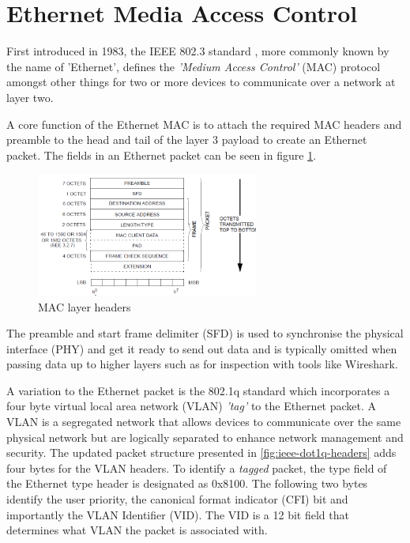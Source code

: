 \section{Ethernet Media Access Control}
\label{sec:eth_mac_lit}

First introduced in 1983, the IEEE 802.3 standard \cite{IEEE802.3-2012}, more commonly known by the name of 'Ethernet', defines the \textit{'Medium Access Control'} (MAC) protocol amongst other things for two or more devices to communicate over a network at layer two. 

A core function of the Ethernet MAC is to attach the required MAC headers and preamble to the head and tail of the layer 3 payload to create an Ethernet packet. The fields in an Ethernet packet can be seen in figure \ref{fig:ieee-mac-headers}. 

\begin{figure}[h]
    \centering
    \includegraphics[width=0.65\textwidth]{Images/mac_packet.png}
    \caption[MAC layer headers]{MAC layer headers \cite{IEEE802.3-2012}}
    \label{fig:ieee-mac-headers}
\end{figure}

\noindent The preamble and start frame delimiter (SFD) is used to synchronise the physical interface (PHY) and get it ready to send out data and is typically omitted when passing data up to higher layers such as for inspection with tools like Wireshark.

A variation to the Ethernet packet is the 802.1q standard \cite{IEEE802.1q-2005} which incorporates a four byte virtual local area network (VLAN) \textit{'tag'} to the Ethernet packet. A VLAN is a segregated network that allows devices to communicate over the same physical network but are logically separated to enhance network management and security. The updated packet structure presented in \ref{fig:ieee-dot1q-headers} adds four bytes for the VLAN headers. To identify a \textit{tagged} packet, the type field of the Ethernet type header is designated as 0x8100. The following two bytes identify the user priority, the canonical format indicator (CFI) bit and importantly the VLAN Identifier (VID). The VID is a 12 bit field that determines what VLAN the packet is associated with.


